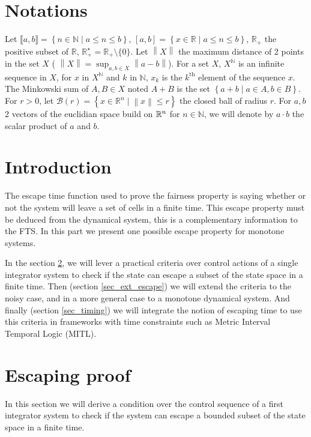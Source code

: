 \section*{Notations}

Let $\llbracket a,b \rrbracket = \left \{n \in \mathbb{N} \mid a \leq n \leq b \right \}$, $\left [ a,b \right ]= \left \{x \in \mathbb{R} \mid a \leq n \leq b \right \}$, $\mathbb{R}_+$ the positive subset of $\mathbb{R}$, $\mathbb{R}_+^\star = \mathbb{R}_+ \setminus \{0\}$.
Let $\left \| X \right \|$ the maximum distance of 2 points in the set $X$ ( $\left \| X \right \| = \sup_{a,b \in X} \left \| a-b\right \|$).
For a set $X$, $X^{\mathbb{N}}$ is an infinite sequence in $X$, for $x$ in $X^{\mathbb{N}}$ and $k$ in $\mathbb{N}$, $x_k$ is the $k^{\textrm{th}}$ element of the sequence $x$.
The Minkowski sum of $A,B \in X$ noted $A+B$ is the set $\left \{a+b \mid a \in A, b\in B \right \}$.
For $r>0$, let $\mathcal{B}(r) = \left \{ x \in \mathbb{R}^n \mid \left \| x \right \| \leq r \right \}$ the closed ball of radius $r$.
For $a,b$ 2 vectors of the euclidian space build on $\mathbb{R}^n$ for $n\in \mathbb{N}$, we will denote by $a \cdot b$ the scalar product of $a$ and $b$.

\section{Introduction}
The escape time function used to prove the fairness property is saying whether or not the system will leave a set of cells in a finite time.
This escape property must be deduced from the dynamical system, this is a complementary information to the FTS.
In this part we present one possible escape property for monotone systems.

In the section \ref{sec_escape}, we will lever a practical criteria over control actions of a single integrator system to check if the state can escape a subset of the state space in a finite time.
Then (section \ref{sec_ext_escape}) we will extend the criteria to the noisy case, and in a more general case to a monotone dynamical system.
And finally (section \ref{sec_timing}) we will integrate the notion of escaping time to use this criteria in frameworks with time constraints such as Metric Interval Temporal Logic (MITL).

\section{Escaping proof}\label{sec_escape}
In this section we will derive a condition over the control sequence of a first integrator system to check if the system can escape a bounded subset of the state space in a finite time.

